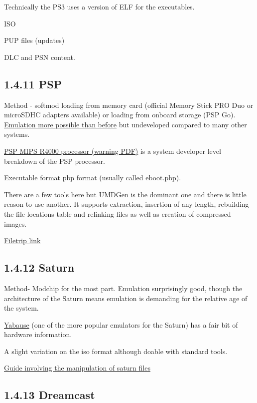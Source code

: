 \documentclass[
]{book}
\begin{document}
Technically the PS3 uses a version of ELF for the executables.

ISO

PUP files (updates)

DLC and PSN content.

\hypertarget{psp}{%
\subsection{1.4.11 PSP}\label{psp}}

Method - softmod loading from memory card (official Memory Stick PRO Duo or microSDHC adapters available) or loading from onboard storage (PSP Go). \href{http://www.ppsspp.org/}{Emulation more possible than before} but undeveloped compared to many other systems.

\href{http://groups.csail.mit.edu/cag/raw/documents/R4400_Uman_book_Ed2.pdf}{PSP MIPS R4000 processor (warning PDF)} is a system developer level breakdown of the PSP processor.

Executable format pbp format (usually called eboot.pbp).

There are a few tools here but UMDGen is the dominant one and there is little reason to use another. It supports extraction, insertion of any length, rebuilding the file locations table and relinking files as well as creation of compressed images.

\href{http://filetrip.net/psp-downloads/tools-utilities/download-umdgen-400-f6743.html}{Filetrip link}

\hypertarget{saturn}{%
\subsection{1.4.12 Saturn}\label{saturn}}

Method- Modchip for the most part. Emulation surprisingly good, though the architecture of the Saturn means emulation is demanding for the relative age of the system.

\href{http://wiki.yabause.org/index.php5?title=Main_Page}{Yabause} (one of the more popular emulators for the Saturn) has a fair bit of hardware information.

A slight variation on the iso format although doable with standard tools.

\href{http://www.rockin-b.de/saturn-patching-enemyzero.html}{Guide involving the manipulation of saturn files}

\hypertarget{dreamcast}{%
\subsection{1.4.13 Dreamcast}\label{dreamcast}}
\end{document}
